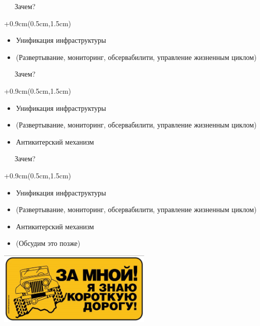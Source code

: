 \documentclass[xetex,18pt,aspectratio=43]{beamer}
\begin{document}
\begin{Large}
\begin{frame}{\ \ \ Зачем?}
\begin{textblock*}{\framewidth+0.9cm}(0.5cm,1.5cm)
\begin{itemize}
  \item Унификация инфраструктуры
  \item (Развертывание, мониторинг, обсервабилити, управление жизненным циклом)
\end{itemize}
\end{textblock*}
\end{frame}

\begin{frame}{\ \ \ Зачем?}
\begin{textblock*}{\framewidth+0.9cm}(0.5cm,1.5cm)
\begin{itemize}
  \item Унификация инфраструктуры
  \item (Развертывание, мониторинг, обсервабилити, управление жизненным циклом)
  \item Антикитерский механизм
\end{itemize}
\end{textblock*}
\end{frame}

\begin{frame}{\ \ \ Зачем?}
\begin{textblock*}{\framewidth+0.9cm}(0.5cm,1.5cm)
\begin{itemize}
  \item Унификация инфраструктуры
  \item (Развертывание, мониторинг, обсервабилити, управление жизненным циклом)
  \item Антикитерский механизм
  \item (Обсудим это позже)
\end{itemize}
\begin{minipage}{\textwidth}
  \centering
  \includegraphics[height=3.5cm]{img/dont2}
\end{minipage}
\end{textblock*}
\end{frame}


\end{Large}
\end{document}
